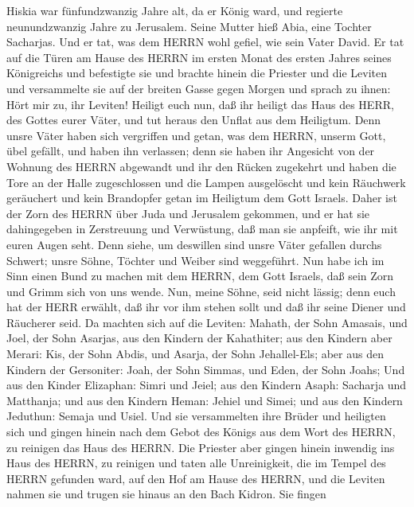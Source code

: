  Hiskia war fünfundzwanzig Jahre alt, da er König ward, und
regierte neunundzwanzig Jahre zu Jerusalem. Seine Mutter hieß Abia, eine
Tochter Sacharjas.  Und er tat, was dem HERRN wohl gefiel,
wie sein Vater David.  Er tat auf die Türen am Hause des
HERRN im ersten Monat des ersten Jahres seines Königreichs und
befestigte sie  und brachte hinein die Priester und die
Leviten und versammelte sie auf der breiten Gasse gegen Morgen
 und sprach zu ihnen: Hört mir zu, ihr Leviten! Heiligt euch
nun, daß ihr heiligt das Haus des HERR, des Gottes eurer Väter, und tut
heraus den Unflat aus dem Heiligtum.  Denn unsre Väter haben
sich vergriffen und getan, was dem HERRN, unserm Gott, übel gefällt, und
haben ihn verlassen; denn sie haben ihr Angesicht von der Wohnung des
HERRN abgewandt und ihr den Rücken zugekehrt  und haben die
Tore an der Halle zugeschlossen und die Lampen ausgelöscht und kein
Räuchwerk geräuchert und kein Brandopfer getan im Heiligtum dem Gott
Israels.  Daher ist der Zorn des HERRN über Juda und
Jerusalem gekommen, und er hat sie dahingegeben in Zerstreuung und
Verwüstung, daß man sie anpfeift, wie ihr mit euren Augen seht.
 Denn siehe, um deswillen sind unsre Väter gefallen durchs
Schwert; unsre Söhne, Töchter und Weiber sind weggeführt. 
Nun habe ich im Sinn einen Bund zu machen mit dem HERRN, dem Gott
Israels, daß sein Zorn und Grimm sich von uns wende.  Nun,
meine Söhne, seid nicht lässig; denn euch hat der HERR erwählt, daß ihr
vor ihm stehen sollt und daß ihr seine Diener und Räucherer seid.
 Da machten sich auf die Leviten: Mahath, der Sohn Amasais,
und Joel, der Sohn Asarjas, aus den Kindern der Kahathiter; aus den
Kindern aber Merari: Kis, der Sohn Abdis, und Asarja, der Sohn
Jehallel-Els; aber aus den Kindern der Gersoniter: Joah, der Sohn
Simmas, und Eden, der Sohn Joahs;  Und aus den Kinder
Elizaphan: Simri und Jeiel; aus den Kindern Asaph: Sacharja und
Matthanja;  und aus den Kindern Heman: Jehiel und Simei;
und aus den Kindern Jeduthun: Semaja und Usiel.  Und sie
versammelten ihre Brüder und heiligten sich und gingen hinein nach dem
Gebot des Königs aus dem Wort des HERRN, zu reinigen das Haus des HERRN.
 Die Priester aber gingen hinein inwendig ins Haus des
HERRN, zu reinigen und taten alle Unreinigkeit, die im Tempel des HERRN
gefunden ward, auf den Hof am Hause des HERRN, und die Leviten nahmen
sie und trugen sie hinaus an den Bach Kidron.  Sie fingen
